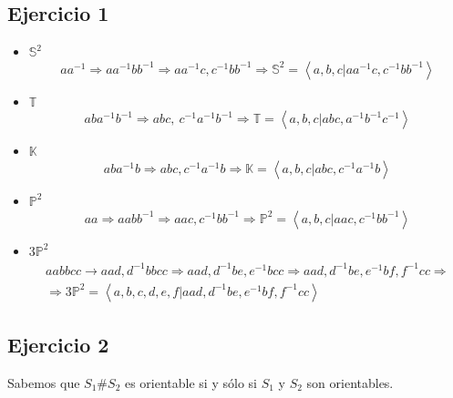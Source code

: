 \documentclass{article}
\begin{document}
\subsection{Ejercicio 1}
\begin{itemize}
\item $\mathbb{S}^2$
\begin{equation*}
aa^{-1}\Rightarrow aa^{-1}bb^{-1}\Rightarrow aa^{-1}c,c^{-1}bb^{-1}\Rightarrow \mathbb{S}^2=\left\langle a,b,c|aa^{-1}c,c^{-1}bb^{-1}\right\rangle
\end{equation*}

\item $\mathbb{T}$
\begin{equation*}
aba^{-1}b^{-1}\Rightarrow abc,\:c^{-1}a^{-1}b^{-1}\Rightarrow \mathbb{T}=\left\langle a,b,c|abc, a^{-1}b^{-1}c^{-1}\right\rangle
\end{equation*}

\item $\mathbb{K}$
\begin{equation*}
aba^{-1}b\Rightarrow abc, c^{-1}a^{-1}b\Rightarrow \mathbb{K}=\left\langle a,b,c|abc,c^{-1}a^{-1}b\right\rangle
\end{equation*}

\item $\mathbb{P}^2$
\begin{equation*}
aa\Rightarrow aabb^{-1}\Rightarrow aac, c^{-1}bb^{-1}\Rightarrow \mathbb{P}^2=\left\langle a,b,c|aac, c^{-1}bb^{-1}\right\rangle
\end{equation*}

\item $3\mathbb{P}^2$
\begin{gather*}
aabbcc\rightarrow aad, d^{-1}bbcc\Rightarrow aad, d^{-1}be, e^{-1}bcc\Rightarrow aad, d^{-1}be,e^{-1}bf, f^{-1}cc \Rightarrow\\
\Rightarrow 3\mathbb{P}^2=\left\langle a,b,c,d,e,f| aad, d^{-1}be, e^{-1}bf, f^{-1}cc\right\rangle
\end{gather*}
\end{itemize}

\subsection{Ejercicio 2}
Sabemos que $S_1\#S_2$ es orientable si y sólo si $S_1$ y $S_2$ son orientables.
\end{document}
